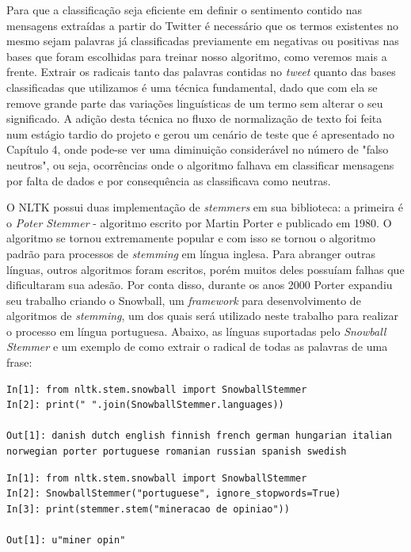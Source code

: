 Para que a classificação seja eficiente em definir o sentimento contido nas mensagens extraídas a partir do Twitter é necessário que os termos existentes no mesmo sejam palavras já classificadas previamente em negativas ou positivas nas bases que foram escolhidas para treinar nosso algoritmo, como veremos mais a frente. Extrair os radicais tanto das palavras contidas no \textit{tweet} quanto das bases classificadas que utilizamos é uma técnica fundamental, dado que com ela se remove grande parte das variações linguísticas de um termo sem alterar o seu significado. A adição desta técnica no fluxo de normalização de texto foi feita num estágio tardio do projeto e gerou um cenário de teste que é apresentado no Capítulo 4, onde pode-se ver uma diminuição considerável no número de "falso neutros", ou seja, ocorrências onde o algoritmo falhava em classificar mensagens por falta de dados e por consequência as classificava como neutras.

O NLTK possui duas implementação de \textit{stemmers} em sua biblioteca: a primeira é o \textit{Poter Stemmer} - algoritmo escrito por Martin Porter e publicado em 1980. O algoritmo se tornou extremamente popular e com isso se tornou o algoritmo padrão para processos de \textit{stemming} em língua inglesa. Para abranger outras línguas, outros algoritmos foram escritos, porém muitos deles possuíam falhas que dificultaram sua adesão. Por conta disso, durante os anos 2000 Porter expandiu seu trabalho criando o Snowball, um \textit{framework} para desenvolvimento de algoritmos de \textit{stemming}, um dos quais será utilizado neste trabalho para realizar o processo em língua portuguesa. Abaixo, as línguas suportadas pelo \textit{Snowball Stemmer} e um exemplo de como extrair o radical de todas as palavras de uma frase:


\begin{lstlisting}[style=python, frame=single]
In[1]: from nltk.stem.snowball import SnowballStemmer
In[2]: print(" ".join(SnowballStemmer.languages))

Out[1]: danish dutch english finnish french german hungarian italian
norwegian porter portuguese romanian russian spanish swedish
\end{lstlisting}



\begin{lstlisting}[style=python, frame=single]
In[1]: from nltk.stem.snowball import SnowballStemmer
In[2]: SnowballStemmer("portuguese", ignore_stopwords=True)
In[3]: print(stemmer.stem("mineracao de opiniao"))

Out[1]: u"miner opin"
\end{lstlisting}


